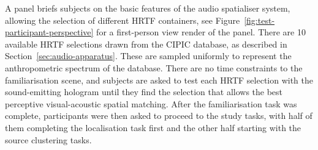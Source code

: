 A panel briefs subjects on the basic features of the audio spatialiser system, allowing the selection of different HRTF containers, see Figure~\ref{fig:test-participant-perspective} for a first-person view render of the panel. There are 10 available HRTF selections drawn from the CIPIC database, as described in Section~\ref{sec:audio-apparatus}. These are sampled uniformly to represent the anthropometric spectrum of the database. There are no time constraints to the familiarisation scene, and subjects are asked to test each HRTF selection with the sound-emitting hologram until they find the selection that allows the best perceptive visual-acoustic spatial matching. After the familiarisation task was complete, participants were then asked to proceed to the study tasks, with half of them completing the localisation task first and the other half starting with the source clustering tasks. \par

